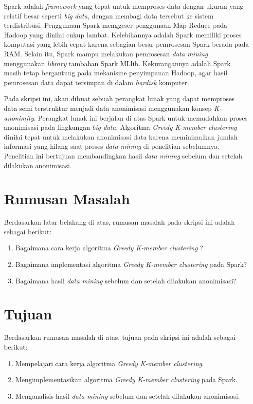 \documentclass[a4paper,twoside]{article}
\begin{document}
Spark adalah {\it framework} yang tepat untuk memproses data dengan ukuran yang relatif besar seperti {\it big data}, dengan membagi data tersebut ke sistem terdistribusi. Penggunaan Spark menggeser penggunaan Map Reduce pada Hadoop yang dinilai cukup lambat. Kelebihannya adalah Spark memiliki proses komputasi yang lebih cepat karena sebagian besar pemrosesan Spark berada pada RAM. Selain itu, Spark mampu melakukan pemrosesan {\it data mining} menggunakan {\it library} tambahan Spark MLlib. Kekurangannya adalah Spark masih tetap bergantung pada mekanisme penyimpanan Hadoop, agar hasil pemrosesan data dapat tersimpan di dalam {\it hardisk} komputer.

Pada skripsi ini, akan dibuat sebuah perangkat lunak yang dapat memproses data semi terstruktur menjadi data anonimisasi menggunakan konsep {\it K-anonimity}. Perangkat lunak ini berjalan di atas Spark untuk memudahkan proses anonimisasi pada lingkungan {\it big data}. Algoritma {\it Greedy K-member clustering} dinilai tepat untuk melakukan anonimisasi data karena meminimalkan jumlah informasi yang hilang saat proses {\it data mining} di penelitian sebelumnya. Penelitian ini bertujuan membandingkan hasil {\it data mining} sebelum dan setelah dilakukan anonimisasi.

\section{Rumusan Masalah}
Berdasarkan latar belakang di atas, rumusan masalah pada skripsi ini adalah sebagai berikut:
\begin{enumerate}
\item Bagaimana cara kerja algoritma {\it Greedy K-member clustering} ?
\item Bagaimana implementasi algoritma {\it Greedy K-member clustering} pada Spark?
\item Bagaimana hasil {\it data mining} sebelum dan setelah dilakukan anonimisasi?
\end{enumerate}

\section{Tujuan}
Berdasarkan rumusan masalah di atas, tujuan pada skripsi ini adalah sebagai berikut:
\begin{enumerate}
\item Mempelajari cara kerja algoritma {\it Greedy K-member clustering}.
\item Mengimplementasikan algoritma {\it Greedy K-member clustering } pada Spark.
\item Menganalisis hasil {\it data mining} sebelum dan setelah dilakukan anonimisasi.
\end{enumerate}
\end{document}
